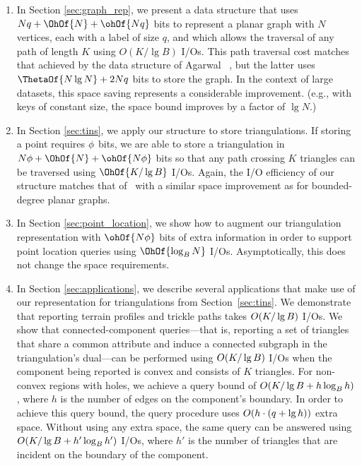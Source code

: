 \begin{enumerate}
\item In Section \ref{sec:graph_rep}, we present a data structure that
  uses $Nq + \OhOf{N} + \ohOf{Nq}$ bits to represent a planar graph with $N$
  vertices, each with a label of size $q$, and which allows the traversal of
  any path of length $K$ using $O(K / \lg B)$ I/Os.
  This path traversal cost matches that achieved by the data structure of
  Agarwal \etal~\cite{DBLP:conf/soda/AgarwalAMVV98}, but the latter
  uses $\ThetaOf{N \lg N} + 2Nq$ bits to store the graph.
  In the context of large datasets, this space saving represents a
  considerable improvement.
  (e.g., with keys of constant size, the space bound improves by
  a factor of $\lg N$.)
\item In Section \ref{sec:tins}, we apply our structure to store
  triangulations.
  If storing a point requires $\phi$ bits, we are able to store a triangulation in
  $N \bitsPerPoint + \OhOf{N} + \ohOf{N \bitsPerPoint}$ bits so that any path crossing $K$
  triangles can be traversed using $\OhOf{K / \lg B}$ I/Os.
  Again, the I/O efficiency of our structure matches that
  of~\cite{DBLP:conf/soda/AgarwalAMVV98} with a similar space improvement
  as for bounded-degree planar graphs.
\item In Section \ref{sec:point_location}, we show how to
  augment our triangulation representation with $\ohOf{N\bitsPerPoint}$ bits of extra
  information in order to support point location 
  queries using $\OhOf{\log_B N}$ I/Os.
  Asymptotically, this does not change the space requirements.
\item In Section \ref{sec:applications}, we describe several
  applications that make use of our representation for triangulations
  from Section~\ref{sec:tins}.
  We demonstrate that reporting terrain profiles and trickle paths takes
  $O\!\left(K / \lg B\right)$ I/Os.
  We show that connected-component queries---that is, reporting a set of
  triangles that share a common attribute and induce a connected
  subgraph in the triangulation's dual---can be performed using
  $O\!\left(K / \lg B\right)$ I/Os when the component being reported is convex and consists
  of $K$ triangles.
  For non-convex regions with holes, we achieve a query bound of
  $O\!\left(K / \lg B + h \log_B h\right)$, where $h$ is the number
  of edges on the component's boundary.
  In order to achieve this query bound, the query procedure uses
  $O\!\left(h \cdot (q + \lg h)\right)$ extra space.
  Without using any extra space, the same query can be answered using
  $O\!\left(K / \lg B + h' \log_B h'\right)$ I/Os, where $h'$ is the number of
  triangles that are incident on the boundary of the component.
\end{enumerate}

